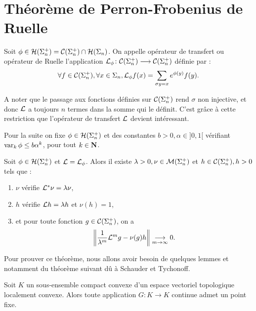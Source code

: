 \section{Théorème de Perron-Frobenius de Ruelle}

  \begin{definition}
    \label{def:transfert_operator}
    \leanok
    Soit $\phi \in \mathcal{H} (\Sigma_{n}^+) = \mathcal{C} (\Sigma_{n}^+) \cap \mathcal{H} (\Sigma_{n})$. On appelle opérateur de transfert ou opérateur de Ruelle l'application
    $\mathcal{L}_{\phi} \colon \mathcal{C} (\Sigma_{n}^+) \longrightarrow \mathcal{C} (\Sigma_{n}^+) $ définie par :
    $$ \forall f \in \mathcal{C} (\Sigma_{n}^+), \forall x \in \Sigma_n, \mathcal{L}_{\phi}f(x) = \sum_{\sigma y = x}{e^{\phi(y)}f(y)}.$$
  \end{definition}

  \begin{remark}
    A noter que le passage aux fonctions définies sur $\mathcal{C} (\Sigma_{n}^+)$ rend $\sigma$ non injective, et donc $\mathcal{L}$ a toujours $n$ termes dans la somme
    qui le définit. C'est grâce à cette restriction que l'opérateur de transfert $\mathcal{L}$ devient intéressant.
  \end{remark}

  Pour la suite on fixe $\phi \in \mathcal{H} (\Sigma_{n}^+)$ et des constantes $b > 0, \alpha \in ]0, 1[$ vérifiant $\operatorname{var}_k\phi \leq b\alpha^k$, pour tout $k \in \mathbf N$.

  \begin{theorem}
    \label{thm:rpf}
    Soit $\phi \in \mathcal{H} (\Sigma_{n}^+)$ et $\mathcal{L} = \mathcal{L}_{\phi}$. Alors il existe $\lambda > 0, \nu \in \mathcal{M} (\Sigma_{n}^+)$ et $h \in \mathcal{C} (\Sigma_{n}^+), h > 0$ tels que :
    \begin{enumerate}
      \item $\nu$ vérifie $\mathcal{L}^*\nu = \lambda\nu$,
      \item $h$ vérifie $\mathcal{L} h = \lambda h$ et $\nu(h) = 1$,
      \item et pour toute fonction $g \in \mathcal{C} (\Sigma_{n}^+)$, on a
	$$\left\lVert \frac 1 {\lambda^m} \mathcal{L}^mg - \nu(g)h\right\rVert \underset{m\to\infty}{\longrightarrow} 0.$$
    \end{enumerate}
  \end{theorem}

  Pour prouver ce théorème, nous allons avoir besoin de quelques lemmes et notamment du théorème suivant dû à Schauder et Tychonoff.

  \begin{theorem}
    \label{thm:schauder}
    \leanok

    Soit $K$ un sous-ensemble compact convexe d'un espace vectoriel topologique localement convexe.
    Alors toute application $G \colon K \longrightarrow K$ continue admet un point fixe.
  \end{theorem}

